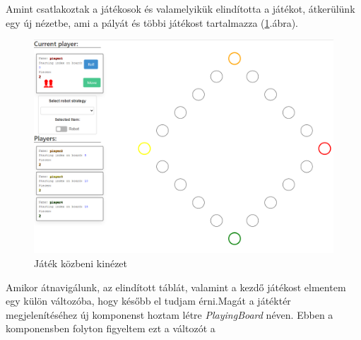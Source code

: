 \documentclass[a4paper,twoside]{article}
\begin{document}
Amint csatlakoztak a játékosok és valamelyikük elindította a játékot, átkerülünk egy új nézetbe, ami a pályát és többi játékost tartalmazza (\ref{playingboard}.ábra).
\begin{figure}
	\caption{Játék közbeni kinézet}
	\label{playingboard}
	\centering
	\includegraphics[scale=0.35]{playingboard}
\end{figure}
\FloatBarrier
Amikor átnavigálunk, az elindított táblát, valamint a kezdő játékost elmentem egy külön változóba, hogy később el tudjam érni.Magát a játéktér megjelenítéséhez új komponenst hoztam létre \textit{PlayingBoard} néven. Ebben  a komponensben folyton figyeltem ezt a változót a
\end{document}
